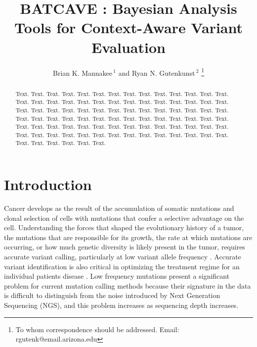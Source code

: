 \documentclass[a4,center,fleqn]{NAR}
\newcommand{\batcave}{BATCAVE }
\begin{document}
\title{\batcave: Bayesian Analysis Tools for Context-Aware Variant Evaluation}

\author{%
Brian K. Mannakee\,$^{1}$ and
Ryan N. Gutenkunst\,$^{2}$%
\footnote{To whom correspondence should be addressed.
Email: rgutenk@email.arizona.edu}}

\address{%
$^{1}$Mel and Enid Zuckerman College of Public Health, University of Arizona, Tucson AZ
and
$^{2}$Department of Molecular and Cellular Biology, University of Arizona, Tucson AZ}


\maketitle

\begin{abstract}
Text. Text. Text. Text. Text. Text. Text. Text. Text. Text. Text.
Text. Text. Text. Text. Text. Text. Text. Text. Text. Text. Text.
Text. Text. Text. Text. Text. Text. Text. Text. Text. Text. Text.
Text. Text. Text. Text. Text. Text. Text. Text. Text. Text. Text.
Text. Text. Text. Text. Text. Text. Text. Text. Text. Text. Text.
Text. Text. Text. Text. Text. Text. Text. Text. Text. Text. Text.
Text. Text. Text. Text. Text. Text. Text. Text. Text. Text. Text.
Text. Text. Text. Text. Text. Text. Text. Text. Text. Text. Text.
Text. Text.
\end{abstract}


\section{Introduction}

Cancer develops as the result of the accumulation of somatic mutations and clonal selection of cells with mutations that confer a selective advantage on the cell.
Understanding the forces that shaped the evolutionary history of a tumor, the mutations that are responsible for its growth, the rate at which mutations are occurring, or how much genetic diversity is likely present in the tumor, requires accurate variant calling, particularly at low variant allele frequency \cite{Williams2016,Bozic2016,Williams2018}.
Accurate variant identification is also critical in optimizing the treatment regime for an individual patients disease \citep{Ding2012,Mardis2012,Chen2013,Borad2014,Findlay2016}.
Low frequency mutations present a significant problem for current mutation calling methods because their signature in the data is difficult to distinguish from the noise introduced by Next Generation Sequencing (NGS), and this problem increases as sequencing depth increases.
\end{document}
